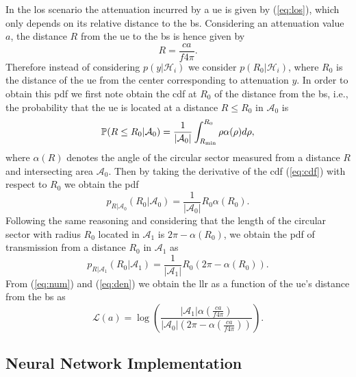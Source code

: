 \documentclass[conference,draftcls,onecolumn]{IEEEtran}
\begin{document}
In the \ac{los} scenario the attenuation incurred by a \ac{ue} is given by (\ref{eq:los}), which only depends on its relative distance to the \ac{bs}. Considering an attenuation value $a$, the distance $R$ from the \ac{ue} to the \ac{bs} is hence given by 
\begin{equation}
    R = \frac{c a}{f 4 \pi}.
\end{equation}
Therefore instead of considering $p(y|\mathcal H_i)$ we consider $p(R_0|\mathcal H_i)$, where $R_0$ is the distance of the \ac{ue} from the center corresponding to attenuation $y$. In order to obtain this \ac{pdf} we first note obtain the \ac{cdf} at $R_0$ of the distance from the \ac{bs}, i.e.,  the probability that the \ac{ue} is located at a distance $R\le R_0$ in $\mathcal{A}_0$ is
\begin{equation}\label{eq:cdf}
     \mathbb{P}(R \le R_0|\mathcal{A}_0) = \frac{1}{|\mathcal{A}_0|}\int_{R_{\rm min}}^{R_0} \rho \alpha(\rho) d\rho,
\end{equation}
where $\alpha(R)$ denotes the angle of the circular sector measured from a distance $R$ and intersecting area $\mathcal{A}_0$. Then by taking the derivative of the \ac{cdf} (\ref{eq:cdf}) with respect to $R_0$ we obtain the \ac{pdf} 
\begin{equation}\label{eq:num}
    p_{R|\mathcal{A}_0}(R_0|\mathcal{A}_0) = \frac{1}{|\mathcal{A}_0|}R_0\alpha(R_0).
\end{equation}
Following the same reasoning and considering that the length of the circular sector with radius $R_0$ located in $\mathcal{A}_1$ is $2\pi - \alpha(R_0)$, we obtain the \ac{pdf} of transmission from a distance $R_0$ in $\mathcal{A}_1$ as
\begin{equation}\label{eq:den}
     p_{R|\mathcal{A}_1}(R_0|\mathcal{A}_1) = \frac{1}{|\mathcal{A}_1|}R_0\left(2\pi-\alpha(R_0)\right).
\end{equation}
From (\ref{eq:num}) and (\ref{eq:den}) we obtain the \ac{llr} as a function of the \ac{ue}'s distance from the \ac{bs} as 
\begin{equation}
    \mathcal{L}(a)=\log\left(\frac{|\mathcal{A}_1|\alpha(\frac{c a}{f 4 \pi})}{|\mathcal{A}_0|\left(2\pi-\alpha(\frac{c a}{f 4 \pi})\right)}\right).
\end{equation}

\subsection{Neural Network Implementation}\label{sec:nn}
\end{document}
